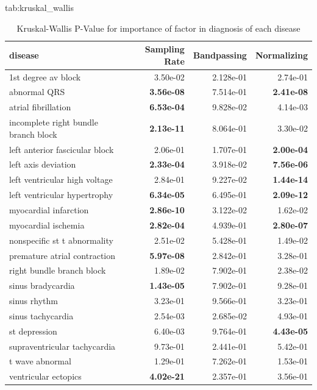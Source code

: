 \documentclass[pmlr,twocolumn]{jmlr}%
\begin{document}
\begin{table}[hbtp]
\floatconts
  {tab:kruskal_wallis}
  {\caption{Kruskal-Wallis P-Value for importance of factor in diagnosis of each disease }}
  {
        \begin{tabular}{|l|r|r|r|}
        \hline
        disease &             Sampling Rate & Bandpassing & Normalizing\\\hline
1st degree av block                  &  3.50e-02  & 2.128e-01 & 2.74e-01  \\
abnormal QRS                         &  \textbf{3.56e-08}  & 7.514e-01 & \textbf{2.41e-08} \\
atrial fibrillation                  &  \textbf{6.53e-04}  & 9.828e-02 & 4.14e-03   \\
incomplete right bundle branch block &  \textbf{2.13e-11}  & 8.064e-01 & 3.30e-02   \\
left anterior fascicular block       &  2.06e-01  & 1.707e-01 & \textbf{2.00e-04}    \\
left axis deviation                  &  \textbf{2.33e-04}  & 3.918e-02 & \textbf{7.56e-06}   \\
left ventricular high voltage        &  2.84e-01  & 9.227e-02 & \textbf{1.44e-14}    \\
left ventricular hypertrophy         &  \textbf{6.34e-05}  & 6.495e-01  & \textbf{2.09e-12}   \\
myocardial infarction                &  \textbf{2.86e-10}  & 3.122e-02  & 1.62e-02  \\
myocardial ischemia                  &  \textbf{2.82e-04}  & 4.939e-01  & \textbf{2.80e-07}  \\
nonspecific st t abnormality         &  2.51e-02  & 5.428e-01 & 1.49e-02  \\
premature atrial contraction         &  \textbf{5.97e-08}  & 2.842e-01 & 3.28e-01  \\
right bundle branch block            &  1.89e-02  & 7.902e-01 & 2.38e-02  \\
sinus bradycardia                    &  \textbf{1.43e-05}  & 7.902e-01 & 9.28e-01  \\
sinus rhythm                         &  3.23e-01  & 9.566e-01 & 3.23e-01  \\
sinus tachycardia                    &  2.54e-03  & 2.685e-02 & 4.93e-01 \\
st depression                        &  6.40e-03  & 9.764e-01 & \textbf{4.43e-05}  \\
supraventricular tachycardia         &  9.73e-01  & 2.441e-01 & 5.42e-01 \\
t wave abnormal                      &  1.29e-01  & 7.262e-01 & 1.53e-01  \\
ventricular ectopics                 &  \textbf{4.02e-21}  & 2.357e-01 & 3.56e-01 \\\hline
        \end{tabular}
  }
\end{table}
\end{document}
